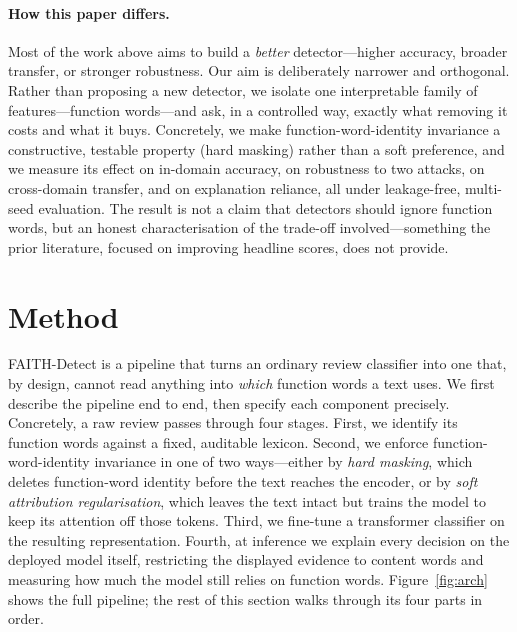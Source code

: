 \documentclass[10pt,twocolumn]{article}
\begin{document}
\paragraph{How this paper differs.}
Most of the work above aims to build a \emph{better} detector---higher accuracy, broader transfer, or stronger robustness. Our aim is deliberately narrower and orthogonal. Rather than proposing a new detector, we isolate one interpretable family of features---function words---and ask, in a controlled way, exactly what removing it costs and what it buys. Concretely, we make function-word-identity invariance a constructive, testable property (hard masking) rather than a soft preference, and we measure its effect on in-domain accuracy, on robustness to two attacks, on cross-domain transfer, and on explanation reliance, all under leakage-free, multi-seed evaluation. The result is not a claim that detectors should ignore function words, but an honest characterisation of the trade-off involved---something the prior literature, focused on improving headline scores, does not provide.

\section{Method}
FAITH-Detect is a pipeline that turns an ordinary review classifier into one that, by design, cannot read anything into \emph{which} function words a text uses. We first describe the pipeline end to end, then specify each component precisely. Concretely, a raw review passes through four stages. First, we identify its function words against a fixed, auditable lexicon. Second, we enforce function-word-identity invariance in one of two ways---either by \emph{hard masking}, which deletes function-word identity before the text reaches the encoder, or by \emph{soft attribution regularisation}, which leaves the text intact but trains the model to keep its attention off those tokens. Third, we fine-tune a transformer classifier on the resulting representation. Fourth, at inference we explain every decision on the deployed model itself, restricting the displayed evidence to content words and measuring how much the model still relies on function words. Figure~\ref{fig:arch} shows the full pipeline; the rest of this section walks through its four parts in order.
\end{document}
